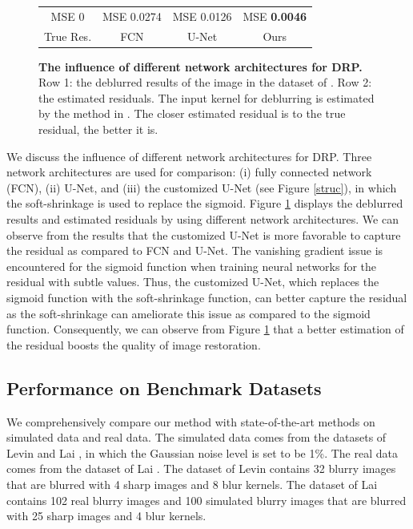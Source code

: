 \documentclass[10pt,twocolumn,letterpaper]{article}
\begin{document}
\begin{figure}[h]
\begin{tabular}{cccc}
			MSE 0&MSE 0.0274&MSE 0.0126&MSE \textbf{0.0046}\\
			True Res.&FCN&U-Net&Ours
		\end{tabular}
		\caption{\textbf{The influence of different network architectures for DRP.} Row 1: the deblurred results of the image in the dataset of \cite{lai2016comparative}. Row 2: the estimated residuals. The input kernel for deblurring is estimated by the method in \cite{perrone2014total}. The closer estimated residual is to the true residual, the better it is.}\label{Structure}
	\end{figure}	 
	We discuss the influence of different network architectures for DRP. Three network architectures are used for comparison: (i) fully connected network (FCN), (ii) U-Net, and (iii) the customized U-Net (see Figure \ref{struc}), in which the soft-shrinkage is used to replace the sigmoid.	 Figure \ref{Structure} displays the deblurred results and estimated residuals by using different network architectures. We can observe from the results that the customized U-Net is more favorable to capture the residual as compared to FCN and  U-Net. The vanishing gradient issue is encountered for the sigmoid function when training  neural networks  for the  residual with subtle values. Thus, the customized  U-Net, which replaces the sigmoid function with the soft-shrinkage function, can better capture the residual as the soft-shrinkage can ameliorate this issue as compared to the sigmoid function. Consequently, we can observe from Figure \ref{Structure} that a better estimation of the residual boosts the quality of image restoration.
	
	\subsection{Performance on Benchmark Datasets}	
	We comprehensively compare our method with state-of-the-art methods on simulated data and real data. The simulated data comes from the datasets of  Levin \etal\cite{levin2009understanding} and Lai \etal\cite{lai2016comparative}, in which the Gaussian noise level  is set to be 1\%. The real data comes from the dataset of Lai \etal\cite{lai2016comparative}. The dataset of Levin \etal\cite{levin2009understanding} contains 32 blurry images that are blurred with 4 sharp images and 8 blur kernels. The dataset of Lai \etal\cite{lai2016comparative} contains 102 real blurry images and 100 simulated blurry images that are blurred with 25 sharp images and 4 blur kernels. 
	
\end{document}
